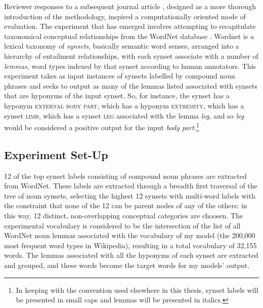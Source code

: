 Reviewer responses to a subsequent journal article \citep{McGregorEA2015c}, designed as a more thorough introduction of the methodology, inspired a computationally oriented mode of evaluation.  The experiment that has emerged involves attempting to recapitulate taxonomical conceptual relationships from the WordNet database \citep{Fellbaum1998}.  Wordnet is a lexical taxonomy of \emph{synsets}, basically semantic word senses, arranged into a hierarchy of entailment relationships, with each synset associate with a number of \emph{lemmas}, word types indexed by that synset according to human annotators.  This experiment takes as input instances of synsets labelled by compound noun phrases and seeks to output as many of the lemmas listed associated with synsets that are hyponyms of the input synset.  So, for instance, the synset  has a hyponym \textsc{external body part}, which has a hyponym \textsc{extremity}, which has a synset \textsc{limb}, which has a synset \textsc{leg} associated with the lemma \emph{leg}, and so \emph{leg} would be considered a positive output for the input \emph{body part}.\footnote{In keeping with the convention used elsewhere in this thesis, synset labels will be presented in small caps and lemmas will be presented in italics.}

\subsection{Experiment Set-Up}
12 of the top synset labels consisting of compound noun phrases are extracted from WordNet.  These labels are extracted through a breadth first traversal of the tree of noun synsets, selecting the highest 12 synsets with multi-word labels with the constraint that none of the 12 can be parent nodes of any of the others: in this way, 12 distinct, non-overlapping conceptual categories are choosen.  The experimental vocabulary is considered to be the intersection of the list of all WordNet noun lemmas associated with the vocabulary of my model (the 200,000 most frequent word types in Wikipedia), resulting in a total vocabulary of 32,155 words.  The lemmas associated with all the hyponyms of each synset are extracted and grouped, and these words become the target words for my models' output.

